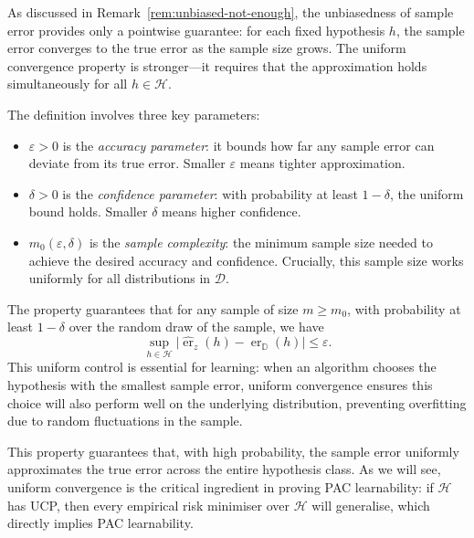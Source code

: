 \begin{remarknl}
    \label{rem:pointwise-to-uniform}
    
    As discussed in Remark~\ref{rem:unbiased-not-enough}, the unbiasedness of sample error provides only a pointwise guarantee: for each fixed hypothesis $h$, the sample error converges to the true error as the sample size grows. The uniform convergence property is stronger—it requires that the approximation holds simultaneously for all $h \in \mathcal{H}$.
    
    The definition involves three key parameters:
    \begin{itemize}
        \item $\varepsilon > 0$ is the \emph{accuracy parameter}: it bounds how far any sample error can deviate from its true error. Smaller $\varepsilon$ means tighter approximation.
        \item $\delta > 0$ is the \emph{confidence parameter}: with probability at least $1-\delta$, the uniform bound holds. Smaller $\delta$ means higher confidence.
        \item $m_0(\varepsilon, \delta)$ is the \emph{sample complexity}: the minimum sample size needed to achieve the desired accuracy and confidence. Crucially, this sample size works uniformly for all distributions in $\mathcal{D}$.
    \end{itemize}
    
    The property guarantees that for any sample of size $m \geq m_0$, with probability at least $1-\delta$ over the random draw of the sample, we have
    \[
        \sup_{h \in \mathcal{H}} \bigl|\hat{\operatorname{er}}_{z}(h) - \operatorname{er}_{\mathbb{D}}(h)\bigr| \leq \varepsilon.
    \]
    This uniform control is essential for learning: when an algorithm chooses the hypothesis with the smallest sample error, uniform convergence ensures this choice will also perform well on the underlying distribution, preventing overfitting due to random fluctuations in the sample.
\end{remarknl}

\noindent
This property guarantees that, with high probability, the sample error uniformly approximates the true error across the entire hypothesis class. As we will see, uniform convergence is the critical ingredient in proving PAC learnability: if $\mathcal{H}$ has UCP, then every empirical risk minimiser over $\mathcal{H}$ will generalise, which directly implies PAC learnability.

